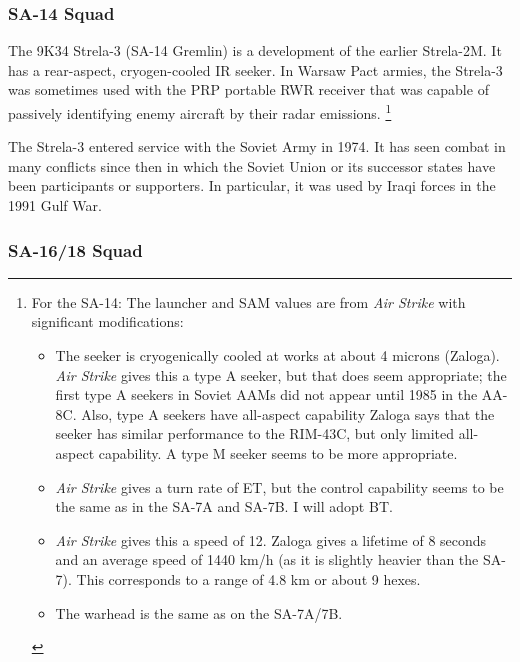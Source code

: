 \documentclass[10pt]{article}
\newcommand{\note}[1]{%
    \footnote{%
        \setlength{\parindent}{0pt}%
        \setlength{\parskip}{\smallskipamount}%
        #1
    }%
}
\begin{document}
\subsubsection{SA-14 Squad}

The 9K34 Strela-3 (SA-14 Gremlin) is a development of the earlier Strela-2M.
It has a rear-aspect, cryogen-cooled IR seeker.
In Warsaw Pact armies, the Strela-3 was sometimes used with the PRP portable RWR receiver that was capable of passively identifying enemy aircraft by their radar emissions.%
\note{
    For the SA-14: The launcher and SAM values are from \emph{Air Strike} with significant modifications:
    \begin{itemize}
        \item The seeker is cryogenically cooled at works at about 4 microns (Zaloga). \emph{Air Strike} gives this a type A seeker, but that does seem appropriate; the first type A seekers in Soviet AAMs did not appear until 1985 in the AA-8C. Also, type A seekers have all-aspect capability Zaloga says that the seeker has similar performance to the RIM-43C, but only limited all-aspect capability. A type M seeker seems to be more appropriate.
        \item \emph{Air Strike} gives a turn rate of ET, but the control capability seems to be the same as in the SA-7A and SA-7B. I will adopt BT.
        \item \emph{Air Strike} gives this a speed of 12. Zaloga gives a lifetime of 8 seconds and an average speed of 1440 km/h (as it is slightly heavier than the SA-7). This corresponds to a range of 4.8 km or about 9 hexes.
        \item The warhead is the same as on the SA-7A/7B.
    \end{itemize}
}

The Strela-3 entered service with the Soviet Army in 1974.
It has seen combat in many conflicts since then in which the Soviet Union or its successor states have been participants or supporters.
In particular, it was used by Iraqi forces in the 1991 Gulf War.

\subsubsection{SA-16/18 Squad}
\end{document}
